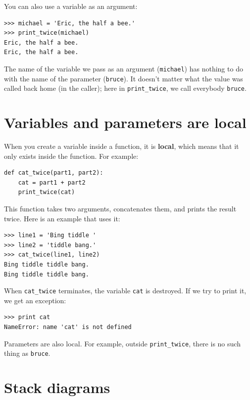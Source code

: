 \documentclass[10pt]{book}
\begin{document}
You can also use a variable as an argument:

\beforeverb
\begin{verbatim}
>>> michael = 'Eric, the half a bee.'
>>> print_twice(michael)
Eric, the half a bee.
Eric, the half a bee.
\end{verbatim}
\afterverb
%
The name of the variable we pass as an argument ({\tt michael}) has
nothing to do with the name of the parameter ({\tt bruce}).  It
doesn't matter what the value was called back home (in the caller);
here in \verb"print_twice", we call everybody {\tt bruce}.


\section{Variables and parameters are local}

When you create a variable inside a function, it is {\bf local},
which means that it only
exists inside the function.  For example:


\beforeverb
\begin{verbatim}
def cat_twice(part1, part2):
    cat = part1 + part2
    print_twice(cat)
\end{verbatim}
\afterverb
%
This function takes two arguments, concatenates them, and prints
the result twice.  Here is an example that uses it:


\beforeverb
\begin{verbatim}
>>> line1 = 'Bing tiddle '
>>> line2 = 'tiddle bang.'
>>> cat_twice(line1, line2)
Bing tiddle tiddle bang.
Bing tiddle tiddle bang.
\end{verbatim}
\afterverb
%
When \verb"cat_twice" terminates, the variable {\tt cat}
is destroyed.  If we try to print it, we get an exception:


\beforeverb
\begin{verbatim}
>>> print cat
NameError: name 'cat' is not defined
\end{verbatim}
\afterverb
%
Parameters are also local.
For example, outside \verb"print_twice", there is no
such thing as {\tt bruce}.



\section{Stack diagrams}
\label{stackdiagram}
\end{document}
